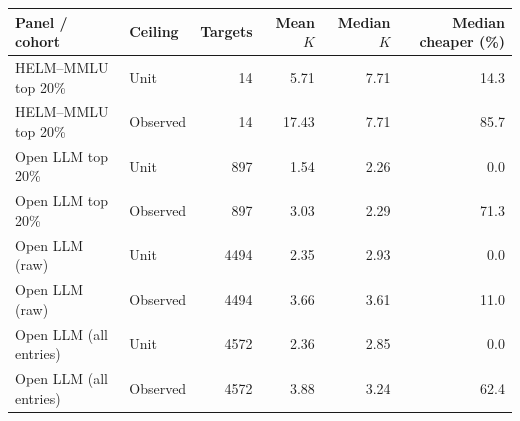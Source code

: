 \begin{tabular}{llrrrr}
\toprule
Panel / cohort & Ceiling & Targets & Mean $K$ & Median $K$ & Median cheaper (\%) \\
\midrule
HELM--MMLU top 20\% & Unit & 14 & 5.71 & 7.71 & 14.3 \\
HELM--MMLU top 20\% & Observed & 14 & 17.43 & 7.71 & 85.7 \\
Open LLM top 20\% & Unit & 897 & 1.54 & 2.26 & 0.0 \\
Open LLM top 20\% & Observed & 897 & 3.03 & 2.29 & 71.3 \\
Open LLM (raw) & Unit & 4494 & 2.35 & 2.93 & 0.0 \\
Open LLM (raw) & Observed & 4494 & 3.66 & 3.61 & 11.0 \\
Open LLM (all entries) & Unit & 4572 & 2.36 & 2.85 & 0.0 \\
Open LLM (all entries) & Observed & 4572 & 3.88 & 3.24 & 62.4 \\
\bottomrule
\end{tabular}
